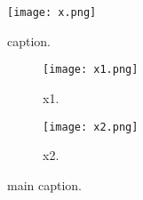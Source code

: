\begin{figure}
    \centering
    \texttt{[image: x.png]}
    \caption{caption.}
    \label{fig:ref}
\end{figure}

\begin{figure}[H]
     \centering
     \begin{subfigure}[t]{0.45\textwidth}
         \centering
         \texttt{[image: x1.png]}
         \caption{x1.}
         \label{fig:x1}
     \end{subfigure}
     \hfill
     \begin{subfigure}[t]{0.45\textwidth}
         \centering
          \texttt{[image: x2.png]}
         \caption{x2.}
         \label{fig:x2}
     \end{subfigure}
     \caption{main caption.}
\end{figure}